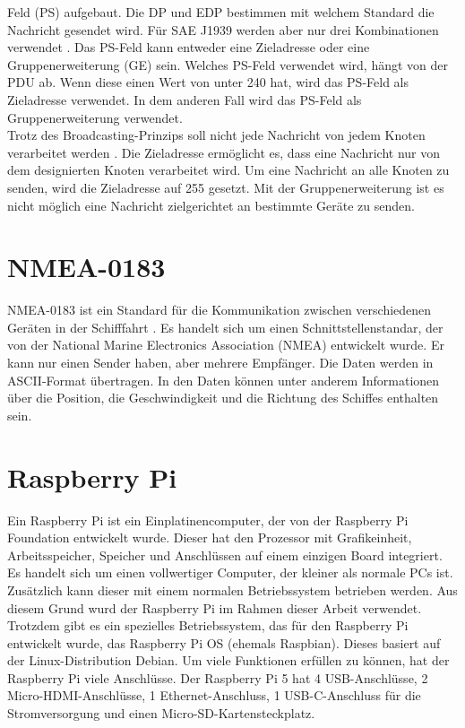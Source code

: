 Feld (PS) aufgebaut. Die DP und EDP bestimmen mit welchem Standard die 
Nachricht gesendet wird. Für SAE J1939 werden aber nur drei Kombinationen verwendet \cite{VectorSAE}.
Das PS-Feld kann entweder eine Zieladresse oder eine Gruppenerweiterung (GE) sein. Welches PS-Feld
verwendet wird, hängt von der PDU ab. Wenn diese einen Wert von unter 240 hat, wird das PS-Feld als Zieladresse verwendet. 
In dem anderen Fall wird das PS-Feld als Gruppenerweiterung verwendet. \\
Trotz des Broadcasting-Prinzips soll nicht jede Nachricht von jedem Knoten verarbeitet werden \cite{Murvay2018}.
Die Zieladresse ermöglicht es, dass eine Nachricht nur von dem designierten Knoten verarbeitet wird.
Um eine Nachricht an alle Knoten 
zu senden, wird die Zieladresse auf 255 gesetzt. Mit der Gruppenerweiterung ist es nicht möglich eine Nachricht 
zielgerichtet an bestimmte Geräte zu senden. 


\section{NMEA-0183}
NMEA-0183 ist ein Standard für die Kommunikation zwischen verschiedenen Geräten in der Schifffahrt \cite{nmea0183}. Es handelt sich um
einen Schnittstellenstandar, der von der National Marine Electronics Association (NMEA) entwickelt wurde. 
Er kann nur einen Sender haben, aber mehrere Empfänger. Die Daten werden in ASCII-Format übertragen. In den Daten 
können unter anderem Informationen über die Position, die Geschwindigkeit und die Richtung des Schiffes enthalten sein.

\section{Raspberry Pi} \label{sec:raspberrypi}
Ein Raspberry Pi ist ein Einplatinencomputer, der von der Raspberry Pi Foundation entwickelt wurde. 
Dieser hat den Prozessor mit Grafikeinheit, Arbeitsspeicher, Speicher und Anschlüssen auf einem einzigen Board integriert.
Es handelt sich um einen vollwertiger Computer, der kleiner als normale PCs ist. Zusätzlich kann dieser mit einem normalen Betriebssystem
betrieben werden. Aus diesem Grund wurd der Raspberry Pi im Rahmen dieser Arbeit verwendet.
Trotzdem gibt es ein spezielles Betriebssystem, das für den Raspberry Pi entwickelt wurde, das Raspberry Pi OS (ehemals Raspbian).
Dieses basiert auf der Linux-Distribution Debian. Um viele Funktionen erfüllen zu können, hat der Raspberry Pi viele Anschlüsse.
Der Raspberry Pi 5 hat 4 USB-Anschlüsse, 2 Micro-HDMI-Anschlüsse, 1 Ethernet-Anschluss, 1 USB-C-Anschluss 
für die Stromversorgung und einen Micro-SD-Kartensteckplatz.